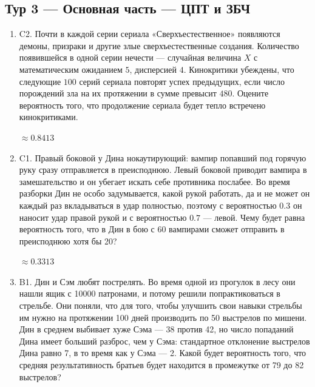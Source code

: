 \documentclass[12pt]{article}
\newenvironment{problem}{}{}
\newenvironment{sol}{}{} %
\begin{document}
\subsection{Тур 3 — Основная часть — ЦПТ и ЗБЧ}
\begin{enumerate}
\begin{problem}
\item[C2.] Почти в каждой серии сериала «Сверхъестественное» появляются демоны, призраки и другие злые сверхъестественные создания. Количество появившейся в одной серии нечести — случайная величина $X$ с математическим ожиданием $5$, дисперсией $4$. Кинокритики убеждены, что следующие $100$ серий сериала повторят успех предыдущих, если число порождений зла на их протяжении в сумме превысит $480$. Оцените вероятность того, что продолжение сериала будет тепло встречено кинокритиками.

\begin{sol}
$\approx 0.8413$
\end{sol}
\end{problem}

\begin{problem}
\item[C1.] Правый боковой у Дина нокаутирующий: вампир попавший под горячую руку сразу отправляется в преисподнюю. Левый боковой приводит вампира в замешательство и он убегает искать себе противника послабее. Во время разборки Дин не особо задумывается, какой рукой работать, да и не может он каждый раз вкладываться в удар полностью, поэтому с вероятностью $0.3$ он наносит удар правой рукой и с вероятностью $0.7$ — левой. Чему будет равна вероятность того, что в Дин в бою с 60 вампирами сможет отправить в преисподнюю хотя бы 20?

\begin{sol}
$\approx 0.3313$
\end{sol}
\end{problem}

\begin{problem}
\item[B1.] Дин и Сэм любят пострелять. Во время одной из прогулок в лесу они нашли ящик с 10000 патронами, и потому решили попрактиковаться в стрельбе. Они поняли, что для того, чтобы улучшить свои навыки стрельбы им нужно на протяжении 100 дней производить по 50 выстрелов по мишени. Дин в среднем выбивает хуже Сэма — 38 против 42, но число попаданий Дина имеет больший разброс, чем у Сэма: стандартное отклонение выстрелов Дина равно 7, в то время как у Сэма — 2. Какой будет вероятность того, что средняя результативность братьев будет находится в промежутке от 79 до 82 выстрелов?


\end{problem}
\end{enumerate}
\end{document}

